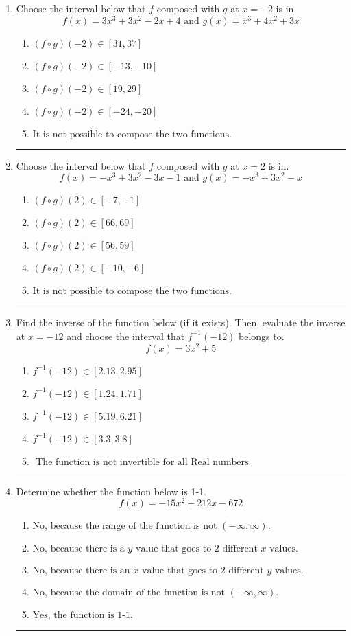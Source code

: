 \documentclass[14pt]{extbook}
\newcommand{\litem}[1]{\item#1\hspace*{-1cm}\rule{\textwidth}{0.4pt}}
\begin{document}
\begin{enumerate}
{\begin{enumerate}[label=\Alph*.]
\end{enumerate} }
\litem{
Choose the interval below that $f$ composed with $g$ at $x=-2$ is in.\[ f(x) = 3x^{3} +3 x^{2} -2 x + 4 \text{ and } g(x) = x^{3} +4 x^{2} +3 x \]\begin{enumerate}[label=\Alph*.]
\item \( (f \circ g)(-2) \in [31, 37] \)
\item \( (f \circ g)(-2) \in [-13, -10] \)
\item \( (f \circ g)(-2) \in [19, 29] \)
\item \( (f \circ g)(-2) \in [-24, -20] \)
\item \( \text{It is not possible to compose the two functions.} \)

\end{enumerate} }
\litem{
Choose the interval below that $f$ composed with $g$ at $x=2$ is in.\[ f(x) = -x^{3} +3 x^{2} -3 x -1 \text{ and } g(x) = -x^{3} +3 x^{2} -x \]\begin{enumerate}[label=\Alph*.]
\item \( (f \circ g)(2) \in [-7, -1] \)
\item \( (f \circ g)(2) \in [66, 69] \)
\item \( (f \circ g)(2) \in [56, 59] \)
\item \( (f \circ g)(2) \in [-10, -6] \)
\item \( \text{It is not possible to compose the two functions.} \)

\end{enumerate} }
\litem{
Find the inverse of the function below (if it exists). Then, evaluate the inverse at $x = -12$ and choose the interval that $f^{-1}(-12)$ belongs to.\[ f(x) = 3 x^2 + 5 \]\begin{enumerate}[label=\Alph*.]
\item \( f^{-1}(-12) \in [2.13, 2.95] \)
\item \( f^{-1}(-12) \in [1.24, 1.71] \)
\item \( f^{-1}(-12) \in [5.19, 6.21] \)
\item \( f^{-1}(-12) \in [3.3, 3.8] \)
\item \( \text{ The function is not invertible for all Real numbers. } \)

\end{enumerate} }
\litem{
Determine whether the function below is 1-1.\[ f(x) = -15 x^2 + 212 x - 672 \]\begin{enumerate}[label=\Alph*.]
\item \( \text{No, because the range of the function is not $(-\infty, \infty)$.} \)
\item \( \text{No, because there is a $y$-value that goes to 2 different $x$-values.} \)
\item \( \text{No, because there is an $x$-value that goes to 2 different $y$-values.} \)
\item \( \text{No, because the domain of the function is not $(-\infty, \infty)$.} \)
\item \( \text{Yes, the function is 1-1.} \)


\end{enumerate}}
\end{enumerate}
\end{document}
